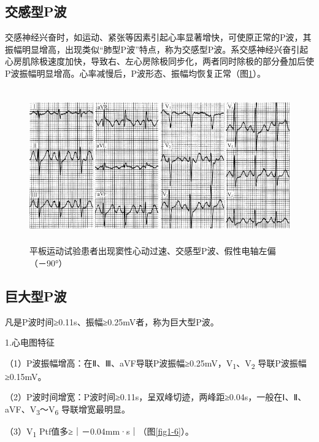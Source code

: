 \protect\hypertarget{text00007.htmlux5cux23subid7}{}{}

\subsection{交感型P波}

交感神经兴奋时，如运动、紧张等因素引起心率显著增快，可使原正常的P波，其振幅明显增高，出现类似“肺型P波”特点，称为交感型P波。系交感神经兴奋引起心房肌除极速度加快，导致右、左心房除极同步化，两者同时除极的部分叠加后使P波振幅明显增高。心率减慢后，P波形态、振幅均恢复正常（图\ref{fig1-5}）。

\begin{figure}[!htbp]
 \centering
 \includegraphics[width=5.42708in,height=2.61458in]{./images/Image00010.jpg}
 \captionsetup{justification=centering}
 \caption{平板运动试验患者出现窦性心动过速、交感型P波、假性电轴左偏（－90°）}
 \label{fig1-5}
  \end{figure} 

\protect\hypertarget{text00007.htmlux5cux23subid8}{}{}

\subsection{巨大型P波}

凡是P波时间≥0.11s、振幅≥0.25mV者，称为巨大型P波。

1.心电图特征

（1）P波振幅增高：在Ⅱ、Ⅲ、aVF导联P波振幅≥0.25mV，V\textsubscript{1}、V\textsubscript{2} 导联P波振幅≥0.15mV。

（2）P波时间增宽：P波时间≥0.11s，呈双峰切迹，两峰距≥0.04s，一般在Ⅰ、Ⅱ、aVF、V\textsubscript{3}～V\textsubscript{6} 导联增宽最明显。

（3）V\textsubscript{1} Ptf值多≥｜－0.04mm·s｜（图\ref{fig1-6}）。

